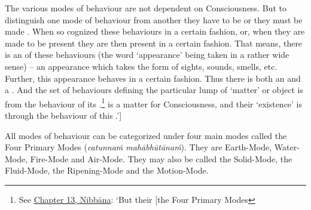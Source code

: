 The various modes of behaviour are not dependent on Consciousness. But to distinguish one mode of behaviour from another they have to be  or they must be made . When so cognized these behaviours  in a certain fashion, or, when they are made to be present they are then present in a certain fashion. That means, there is an  of these behaviours (the word `appearance' being taken in a rather wide sense) -- an appearance which takes the form of sights, sounds, smells, etc. Further, this appearance behaves in a certain fashion. Thus there is both an  and a . And the set of behaviours defining the particular lump of `matter' or object is  from the behaviour of its .\footnote{See \href{ch-13-nibbana.xml\#the-four-primary}{Chapter 13, Nibbāna}: `But their {[}the Four Primary Modes}  is a matter for Consciousness, and their `existence' is  through the behaviour of this .'{]}

All modes of behaviour can be categorized under four main modes called the Four Primary Modes (\emph{catunnaṁ mahābhūtānaṁ}). They are Earth-Mode, Water-Mode, Fire-Mode and Air-Mode. They may also be called the Solid-Mode, the Fluid-Mode, the Ripening-Mode and the Motion-Mode.

